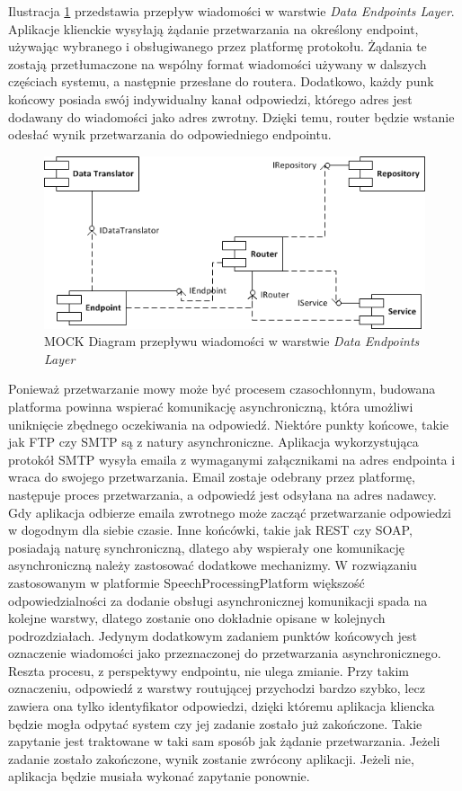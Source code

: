Ilustracja \ref{fig:endpoins_layer_project} przedstawia przepływ wiadomości w warstwie \textit{Data Endpoints Layer}. Aplikacje klienckie wysyłają żądanie przetwarzania na określony endpoint, używając wybranego i obsługiwanego przez platformę protokołu. Żądania te zostają przetłumaczone na wspólny format wiadomości używany w dalszych częściach systemu, a następnie przesłane do routera. Dodatkowo, każdy punk końcowy posiada swój indywidualny kanał odpowiedzi, którego adres jest dodawany do wiadomości jako adres zwrotny. Dzięki temu, router będzie wstanie odesłać wynik przetwarzania do odpowiedniego endpointu.

\begin{figure}[!h]
	\centering
	\includegraphics[scale=1.0]{component_uml.png}
	\caption{MOCK Diagram przepływu wiadomości w warstwie \textit{Data Endpoints Layer}}\label{fig:endpoins_layer_project}
\end{figure}

Ponieważ przetwarzanie mowy może być procesem czasochłonnym, budowana platforma powinna wspierać komunikację asynchroniczną, która umożliwi uniknięcie zbędnego oczekiwania na odpowiedź. Niektóre punkty końcowe, takie jak FTP czy SMTP są z natury asynchroniczne. Aplikacja wykorzystująca protokół SMTP wysyła emaila z wymaganymi załącznikami na adres endpointa i wraca do swojego przetwarzania. Email zostaje odebrany przez platformę, następuje proces przetwarzania, a odpowiedź jest odsyłana na adres nadawcy. Gdy aplikacja odbierze emaila zwrotnego może zacząć przetwarzanie odpowiedzi w dogodnym dla siebie czasie. Inne końcówki, takie jak REST czy SOAP, posiadają naturę synchroniczną, dlatego aby wspierały one komunikację asynchroniczną należy zastosować dodatkowe mechanizmy. W rozwiązaniu zastosowanym w platformie SpeechProcessingPlatform większość odpowiedzialności za dodanie obsługi asynchronicznej komunikacji spada na kolejne warstwy, dlatego zostanie ono dokładnie opisane w kolejnych podrozdziałach. Jedynym dodatkowym zadaniem punktów końcowych jest oznaczenie wiadomości jako przeznaczonej do przetwarzania asynchronicznego. Reszta procesu, z perspektywy endpointu, nie ulega zmianie. Przy takim oznaczeniu, odpowiedź z warstwy routującej przychodzi bardzo szybko, lecz zawiera ona tylko identyfikator odpowiedzi, dzięki któremu aplikacja kliencka będzie mogła odpytać system czy jej zadanie zostało już zakończone. Takie zapytanie jest traktowane w taki sam sposób jak żądanie przetwarzania. Jeżeli zadanie zostało zakończone, wynik zostanie zwrócony aplikacji. Jeżeli nie, aplikacja będzie musiała wykonać zapytanie ponownie.

